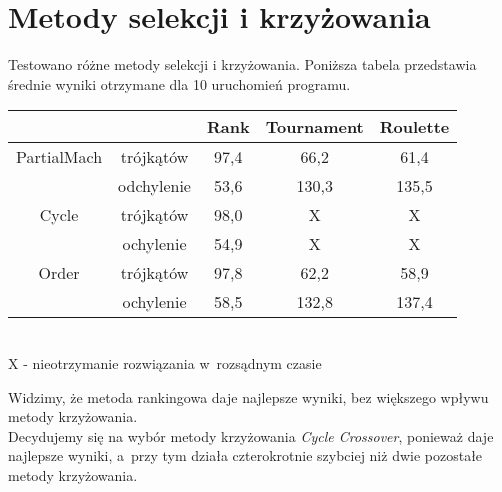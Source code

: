 \documentclass[a4paper,12pt]{article}
\begin{document}
\section{Metody selekcji i krzyżowania}
Testowano różne metody selekcji i krzyżowania. Poniższa tabela przedstawia średnie wyniki otrzymane dla 10 uruchomień programu.\\
\begin{center}
\begin{tabular}{c|c|c|c|c}
&&Rank&Tournament&Roulette\\ \hline
PartialMach&trójkątów&97,4&66,2&61,4\\
&odchylenie&53,6&130,3&135,5\\ \hline
Cycle&trójkątów&98,0&X&X\\
&ochylenie&54,9&X&X\\ \hline
Order&trójkątów&97,8&62,2&58,9\\
&ochylenie&58,5&132,8&137,4\\
\end{tabular}\\
\small
X - nieotrzymanie rozwiązania w~rozsądnym czasie
\normalsize
\end{center}
Widzimy, że metoda rankingowa daje najlepsze wyniki, bez większego wpływu metody krzyżowania.\\
Decydujemy się na wybór metody krzyżowania \textit{Cycle Crossover}, ponieważ daje najlepsze wyniki, a~przy tym działa czterokrotnie szybciej niż dwie pozostałe metody krzyżowania.
\end{document}
